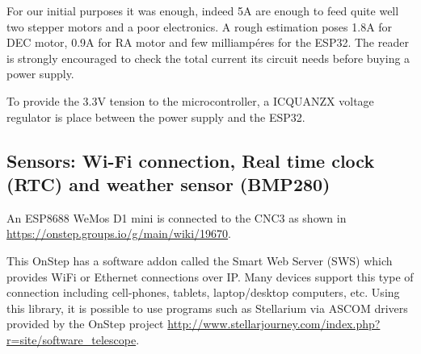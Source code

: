 For our initial purposes it was enough, indeed 5A are enough to feed quite well two stepper motors and a poor electronics.
A rough estimation poses 1.8A for DEC motor, 0.9A for RA motor and few milliampéres for the ESP32. 
The reader is strongly encouraged to check the total current its circuit needs before buying a power supply.

To provide the 3.3V tension to the microcontroller, a ICQUANZX voltage regulator is place between the power supply and the ESP32.

\subsection{Sensors: Wi-Fi connection, Real time clock (RTC) and weather sensor (BMP280)}
An ESP8688 WeMos D1 mini is connected to the CNC3 as shown in \url{https://onstep.groups.io/g/main/wiki/19670}.

This OnStep has a software addon called the Smart Web Server (SWS) which provides WiFi or Ethernet connections over IP.
Many devices support this type of connection including cell-phones, tablets, laptop/desktop computers, etc.
Using this library, it is possible to use programs such as Stellarium via ASCOM drivers provided by the OnStep project \url{http://www.stellarjourney.com/index.php?r=site/software_telescope}.